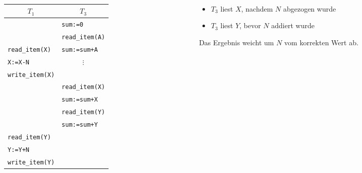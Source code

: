 \begin{frame}{\insertsection}
	\framesubtitle{\insertsubsection}
	\begin{columns}
	\begin{column}{.48\textwidth}
	\begin{tabular}{p{3.0cm}|p{3.0cm}}
			\multicolumn{1}{c|}{$T_1$} & \multicolumn{1}{c}{$T_3$}\\\hline
			& \texttt{sum:=0}\\
			& \texttt{read\_item(A)}\\
			\texttt{read\_item(X)} & \texttt{sum:=sum+A}\\
			\texttt{X:=X-N} & \multicolumn{1}{c}{$\vdots$}  \\
			\texttt{write\_item(X)} & \\ 
			& \texttt{read\_item(X)} \\
			& \texttt{sum:=sum+X}\\
			& \texttt{read\_item(Y)}\\
			& \texttt{sum:=sum+Y} \\
			\texttt{read\_item(Y)}& \\
			\texttt{Y:=Y+N} & \\
			\texttt{write\_item(Y)} & \\\hline
			\end{tabular}
		\end{column}
		\begin{column}{.48\textwidth}
		\begin{itemize}
			\item $T_3$ liest $X$, nachdem $N$ abgezogen wurde 
			\item $T_3$ liest $Y$, bevor $N$ addiert wurde 
		\end{itemize}
		\alert{Das Ergebnis weicht um $N$ vom korrekten Wert ab.}
		\end{column}
	\end{columns}
	\end{frame}


